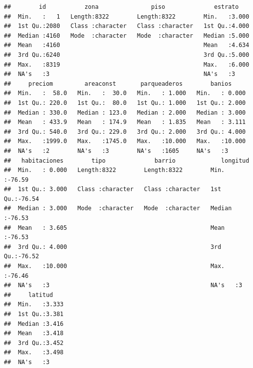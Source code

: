 \documentclass[
]{article}
\begin{document}
\begin{verbatim}
##        id           zona               piso              estrato     
##  Min.   :   1   Length:8322        Length:8322        Min.   :3.000  
##  1st Qu.:2080   Class :character   Class :character   1st Qu.:4.000  
##  Median :4160   Mode  :character   Mode  :character   Median :5.000  
##  Mean   :4160                                         Mean   :4.634  
##  3rd Qu.:6240                                         3rd Qu.:5.000  
##  Max.   :8319                                         Max.   :6.000  
##  NA's   :3                                            NA's   :3      
##     preciom         areaconst       parqueaderos        banios      
##  Min.   :  58.0   Min.   :  30.0   Min.   : 1.000   Min.   : 0.000  
##  1st Qu.: 220.0   1st Qu.:  80.0   1st Qu.: 1.000   1st Qu.: 2.000  
##  Median : 330.0   Median : 123.0   Median : 2.000   Median : 3.000  
##  Mean   : 433.9   Mean   : 174.9   Mean   : 1.835   Mean   : 3.111  
##  3rd Qu.: 540.0   3rd Qu.: 229.0   3rd Qu.: 2.000   3rd Qu.: 4.000  
##  Max.   :1999.0   Max.   :1745.0   Max.   :10.000   Max.   :10.000  
##  NA's   :2        NA's   :3        NA's   :1605     NA's   :3       
##   habitaciones        tipo              barrio             longitud     
##  Min.   : 0.000   Length:8322        Length:8322        Min.   :-76.59  
##  1st Qu.: 3.000   Class :character   Class :character   1st Qu.:-76.54  
##  Median : 3.000   Mode  :character   Mode  :character   Median :-76.53  
##  Mean   : 3.605                                         Mean   :-76.53  
##  3rd Qu.: 4.000                                         3rd Qu.:-76.52  
##  Max.   :10.000                                         Max.   :-76.46  
##  NA's   :3                                              NA's   :3       
##     latitud     
##  Min.   :3.333  
##  1st Qu.:3.381  
##  Median :3.416  
##  Mean   :3.418  
##  3rd Qu.:3.452  
##  Max.   :3.498  
##  NA's   :3
\end{verbatim}
\end{document}
